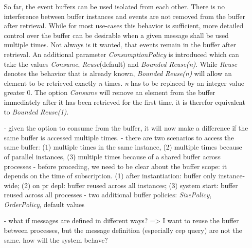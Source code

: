 So far, the event buffers can be used isolated from each other. There is no interference between buffer instances and events are not removed from the buffer after retrieval.
While for most use-cases this behavior is sufficient, more detailed control over the buffer can be desirable when a given message shall be used multiple times.
Not always is it wanted, that events remain in the buffer after retrieval.
An additional parameter \textit{ConsumptionPolicy} is introduced which can take the values \textit{Consume}, \textit{Reuse}(default) and \textit{Bounded Reuse(n)}.
While \textit{Reuse} denotes the behavior that is already known, \textit{Bounded Reuse(n)} will allow an element to be retrieved exactly \textit{n} times. \textit{n} has to be replaced by an integer value greater 0.
The option \textit{Consume} will remove an element from the buffer immediately after it has been retrieved for the first time, it is therefor equivalent to \textit{Bounded Reuse(1)}.

- given the option to consume from the buffer, it will now make a difference if the same buffer is accessed multiple times.
- there are two scenarios to access the same buffer: (1) multiple times in the same instance, (2) multiple times because of parallel instances, (3) multiple times because of a shared buffer across processes
- before proceding, we need to be clear about the buffer scope: it depends on the time of subscription. (1) after instantiation: buffer only instance-wide; (2) on pr depl: buffer reused across all instances; (3) system start: buffer reused across all processes
- two additional buffer policies: \textit{SizePolicy}, \textit{OrderPolicy}, default values

- what if messages are defined in different ways? => I want to reuse the buffer between processes, but the message definition (especially cep query) are not the same. how will the system behave?
